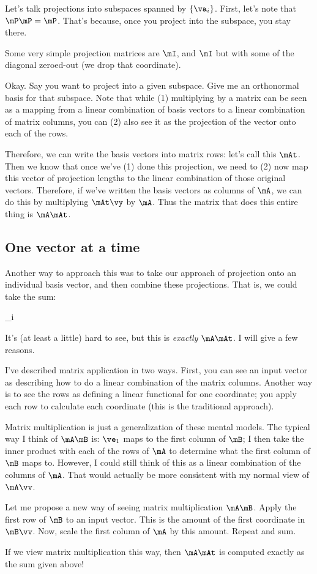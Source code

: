 Let's talk projections into subspaces spanned by $\setof{\va_i}$. First,
let's note that $\mP\mP=\mP$. That's because, once you project into the
subspace, you stay there.

Some very simple projection matrices are $\mI$, and $\mI$ but with some
of the diagonal zeroed-out (we drop that coordinate).

Okay. Say you want to project into a given subspace. Give me an
orthonormal basis for that subspace. Note that while (1) multiplying
by a matrix can be seen as a mapping from a linear combination of
basis vectors to a linear combination of matrix columns, you can (2)
also see it as the projection of the vector onto each of the rows.

Therefore, we can write the basis vectors into matrix rows: let's call
this $\mAt$. Then we know that once we've (1) done this projection, we
need to (2) now map this vector of projection lengths to the linear
combination of those original vectors. Therefore, if we've written the
basis vectors as columns of $\mA$, we can do this by multiplying $\mAt
\vy$ by $\mA$. Thus the matrix that does this entire thing is $\mA\mAt$.

\subsection{One vector at a time}

Another way to approach this was to take our approach of projection
onto an individual basis vector, and then combine these
projections. That is, we could take the sum:

\begin{nedqn}
  \sum_i
  \vx
\end{nedqn}

It's (at least a little) hard to see, but this is \emph{exactly}
$\mA\mAt$. I will give a few reasons.

I've described matrix application in two ways. First, you can see an
input vector as describing how to do a linear combination of the
matrix columns. Another way is to see the rows as defining a linear
functional for one coordinate; you apply each row to calculate each
coordinate (this is the traditional approach).

Matrix multiplication is just a generalization of these mental models.
The typical way I think of $\mA\mB$ is: $\ve_1$ maps to the first column
of $\mB$; I then take the inner product with each of the rows of $\mA$
to determine what the first column of $\mB$ maps to. However, I could
still think of this as a linear combination of the columns of $\mA$.
That would actually be more consistent with my normal view of $\mA\vv$.

Let me propose a new way of seeing matrix multiplication $\mA\mB$. Apply
the first row of $\mB$ to an input vector. This is the amount of the
first coordinate in $\mB\vv$. Now, scale the first column of $\mA$ by
this amount. Repeat and sum.

If we view matrix multiplication this way, then $\mA\mAt$ is computed
exactly as the sum given above!
